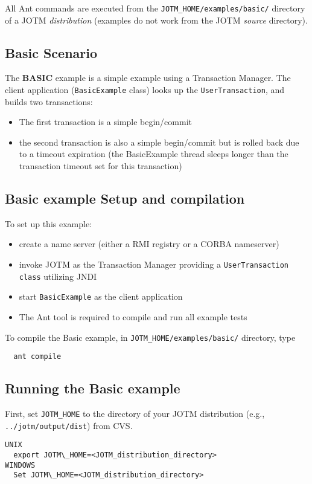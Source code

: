 \documentclass[a4paper,11pt]{article}
\begin{document}
All Ant commands are executed from the \texttt{JOTM\_HOME/examples/basic/}
directory of a JOTM \emph{distribution} (examples do not work from the JOTM 
\emph{source} directory).

\subsection{Basic Scenario}
\label{sec:basic_scenario}


The \textbf{BASIC} example is a simple example using a Transaction
 Manager. The client application (\texttt{BasicExample} class)
looks up the \texttt{UserTransaction}, and builds two transactions:
\begin{itemize}
\item The first transaction is a simple begin/commit
\item the second transaction is also a simple begin/commit but is
  rolled back due to a timeout expiration (the BasicExample thread sleeps
 longer than the transaction timeout set for this transaction)
\end{itemize}


\subsection{Basic example Setup and compilation}
\label{sec:basic_setup}

To set up this example:
\begin{itemize}
\item create a name server (either a RMI registry or a CORBA nameserver)
\item invoke JOTM as the Transaction Manager providing a \texttt{UserTransaction class} utilizing JNDI
\item start \texttt{BasicExample} as the client application
\item The Ant tool is required to compile and run all example tests
\end{itemize}

\noindent To compile the Basic example, in \texttt{JOTM\_HOME/examples/basic/} directory, type
\begin{verbatim}
  ant compile
\end{verbatim}

\subsection{Running the Basic example}
\label{sec:basic_run}
First, set \texttt{JOTM\_HOME} to the directory of your JOTM distribution (e.g.,
\texttt{../jotm/output/dist}) from CVS.
\begin{verbatim}
UNIX
  export JOTM\_HOME=<JOTM_distribution_directory>
WINDOWS
  Set JOTM\_HOME=<JOTM_distribution_directory>
\end{verbatim}
\end{document}
